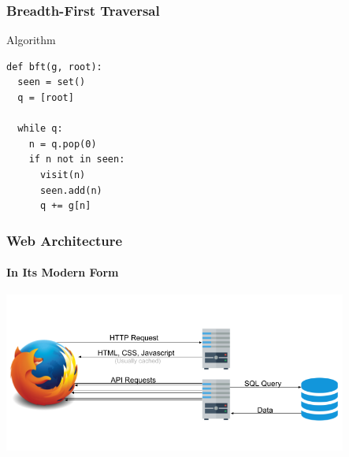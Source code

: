\documentclass[dvipsnames]{beamer}
\begin{document}
\begin{frame}[fragile=singleslide]
  \frametitle{Breadth-First Traversal}
  \begin{block}{Algorithm}
    \begin{Verbatim}
def bft(g, root):
  seen = set()   
  q = [root]     
                 
  while q:       
    n = q.pop(0) 
    if n not in seen:
      visit(n)   
      seen.add(n)
      q += g[n]    
    \end{Verbatim}
  \end{block}
\end{frame}


\begin{frame}
  \frametitle{Web Architecture}
  \framesubtitle{In Its Modern Form}
  \includegraphics[width=320pt]{img/web-architecture-2.png}
\end{frame}
\end{document}
